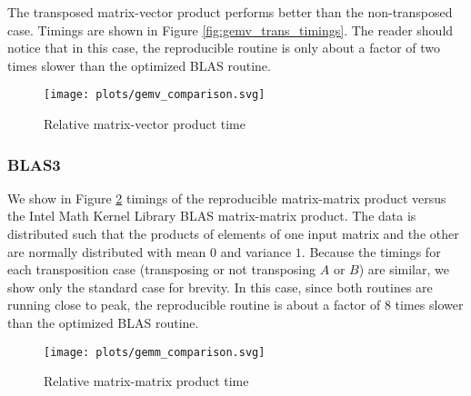   The transposed matrix-vector product performs better than the non-transposed case. Timings are shown in Figure \ref{fig:gemv_trans_timings}. The reader should notice that in this case, the reproducible routine is only about a factor of two times slower than the optimized BLAS routine.
  \begin{figure}[H]
  \begin{center}
  \texttt{[image: plots/gemv\_comparison.svg]}
  \caption{Relative matrix-vector product time}
  \label{fig:gemv_timings}
  \end{center}
  \end{figure}

  \subsubsection{BLAS3}
    We show in Figure \ref{fig:gemm_timings} timings of the reproducible matrix-matrix product versus the Intel Math Kernel Library \cite{MKL} BLAS matrix-matrix product. The data is distributed such that the products of elements of one input matrix and the other are normally distributed with mean $0$ and variance $1$. Because the timings for each transposition case (transposing or not transposing $A$ or $B$) are similar, we show only the standard case for brevity. In this case, since both routines are running close to peak, the reproducible routine is about a factor of 8 times slower than the optimized BLAS routine.
  \begin{figure}[H]
  \begin{center}
  \texttt{[image: plots/gemm\_comparison.svg]}
  \caption{Relative matrix-matrix product time}
  \label{fig:gemm_timings}
  \end{center}
  \end{figure}
